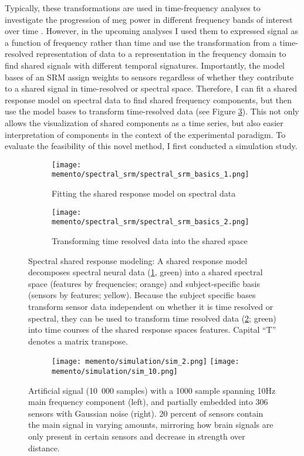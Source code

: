 Typically, these transformations are used in time-frequency analyses to investigate the progression of \gls{meg} power in different frequency bands of interest over time \citep{hari2017primer}.
However, in the upcoming analyses I used them to expressed signal as a function of frequency rather than time and use the transformation from a time-resolved representation of data to a representation in the frequency domain to find shared signals with different temporal signatures.
Importantly, the model bases of an \gls{SRM} assign weights to sensors regardless of whether they contribute to a shared signal in time-resolved or spectral space.
Therefore, I can fit a shared response model on spectral data to find shared frequency components, but then use the model bases to transform time-resolved data (see Figure \ref{fig:spectral-srm}).
This not only allows the visualization of shared components as a time series, but also easier interpretation of components in the context of the experimental paradigm.
To evaluate the feasibility of this novel method, I first conducted a simulation study.

\begin{figure}
	\centering
	\begin{subfigure}{0.9\textwidth}
		\texttt{[image: memento/spectral\_srm/spectral\_srm\_basics\_1.png]}
		\caption{Fitting the shared response model on spectral data}
		\label{fig:spectral-srm1}
	\end{subfigure}
	\begin{subfigure}{0.9\textwidth}
		\texttt{[image: memento/spectral\_srm/spectral\_srm\_basics\_2.png]}
		\caption{Transforming time resolved data into the shared space}
		\label{fig:spectral-srm2}
	\end{subfigure}
	\caption[Spectral shared response modeling]{Spectral shared response modeling: A shared response model decomposes spectral neural data (\ref{fig:spectral-srm1}, green) into a shared spectral space (features by frequencies; orange) and subject-specific basis (sensors by features; yellow). Because the subject specific bases transform sensor data independent on whether it is time resolved or spectral, they can be used to transform time resolved data (\ref{fig:spectral-srm2}; green) into time courses of the shared response spaces features. Capital ``T'' denotes a matrix transpose.}
	\label{fig:spectral-srm}
\end{figure}

\begin{figure}[H]
	\begin{subfigure}{1\textwidth}
		\centering
		\texttt{[image: memento/simulation/sim\_2.png]}
		\texttt{[image: memento/simulation/sim\_10.png]}
	\end{subfigure}
	\caption[Artificial signal for simulation]{Artificial signal (10~000 samples) with a 1000 sample spanning 10Hz main frequency component (left), and partially embedded into 306 sensors with Gaussian noise (right). 20 percent of sensors contain the main signal in varying amounts, mirroring how brain signals are only present in certain sensors and decrease in strength over distance.}
	\label{fig:sim_artificial_signal}
\end{figure}

